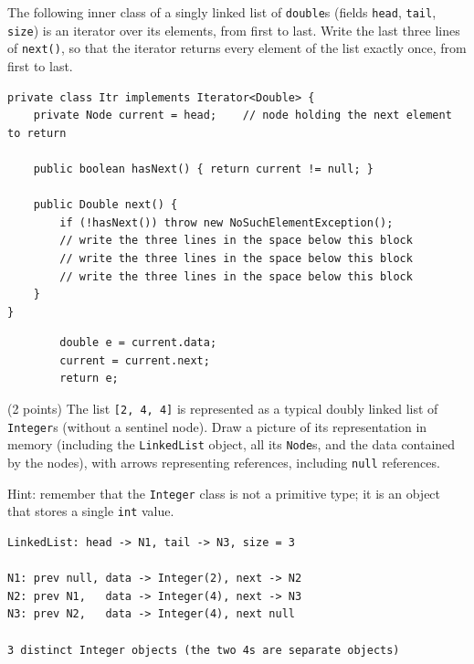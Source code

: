 \begin{question}
The following inner class of a singly linked list of \lstinline|double|s (fields \lstinline|head|, \lstinline|tail|, \lstinline|size|) is an iterator over its elements, from first to last.
Write the last three lines of \lstinline|next()|, so that the iterator returns every element of the list exactly once, from first to last.

\begin{lstlisting}
private class Itr implements Iterator<Double> {
    private Node current = head;    // node holding the next element to return

    public boolean hasNext() { return current != null; }

    public Double next() {
        if (!hasNext()) throw new NoSuchElementException();
        // write the three lines in the space below this block
        // write the three lines in the space below this block
        // write the three lines in the space below this block
    }
}
\end{lstlisting}

\ifanswers
\begin{lstlisting}
        double e = current.data;
        current = current.next;
        return e;
\end{lstlisting}
\else
\vspace{1.2in}
\fi
\end{question}

\begin{question}
(2 points) The list \lstinline|[2, 4, 4]| is represented as a typical doubly linked list of \lstinline|Integer|s (without a sentinel node).
Draw a picture of its representation in memory (including the \lstinline|LinkedList| object, all its \lstinline|Node|s, and the data contained by the nodes), with arrows representing references, including \lstinline|null| references.

Hint: remember that the \lstinline|Integer| class is not a primitive type; it is an object that stores a single \lstinline|int| value.

\ifanswers
\begin{verbatim}
LinkedList: head -> N1, tail -> N3, size = 3

N1: prev null, data -> Integer(2), next -> N2
N2: prev N1,   data -> Integer(4), next -> N3
N3: prev N2,   data -> Integer(4), next null

3 distinct Integer objects (the two 4s are separate objects)
\end{verbatim}
\else
\vspace{3in}
\fi
\end{question}
